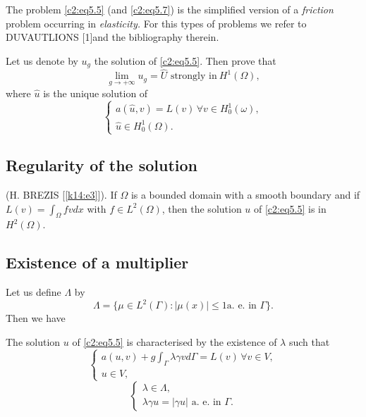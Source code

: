 \begin{remark}\label{c2:rem5.3}%
The problem \eqref{c2:eq5.5} (and \eqref{c2:eq5.7}) is the  simplified version of a {\em
  friction} problem occurring in {\em elasticity.} For  this types of
problems we refer to DUVAUTLIONS [1]and the bibliography therein. 
 \end{remark} 

 \begin{exercise}\label{c2:exer5.1}%
 Let us denote by $u_g$ the solution of \eqref{c2:eq5.5}. Then prove
 that  
 $$
 \lim_{g \to + \infty}  u_g = \hat{U}\text{ strongly in}~ H^1(\Omega),  
 $$
 where $\hat{u}$ is the unique solution of 
\begin{equation*}
\begin{cases}
a(\hat{u}, v) = L (v)\, \forall  v \in H^1_0 (\omega),\\ 
 \hat{u}\in H^1_0 (\Omega).
 \end{cases}
 \end{equation*}
  \end{exercise} 
  
 \subsection{Regularity of the solution}\label{c2:ss5.2}
 
 \begin{theorem}\label{c2:thm5.2}%
 (H. BREZIS [\ref{k14:e3}]). If $\Omega$ is a bounded domain  with a smooth
   boundary and if $L(v) = \int_\Omega f  v dx$ with $f \in
   L^2(\Omega)$, then the solution $u$ of \eqref{c2:eq5.5} is in $H^2(\Omega)$. 
 \end{theorem} 
 
 \subsection{Existence of a multiplier}\label{c2:ss5.3} 
Let us define $\Lambda$ by 
 $$
\Lambda  = \{\mu \in L^2 (\Gamma) : |\mu (x)| \leq 1  \text{
  a. e. in }\Gamma \}. 
 $$
Then we have 
\begin{theorem}\label{c2:thm5.3}%
 The solution $u$ of \eqref{c2:eq5.5} is characterised by the
 existence of $\lambda$ such that  
 \begin{equation}
\begin{cases}
a(u, v) + g \int_\Gamma \lambda \gamma v d \Gamma = L(v)\, \forall  v
\in V,\\ 
 u \in V, \tag{5.8}\label{c2:eq5.8}
\end{cases}
 \end{equation} 
 \begin{equation}
\begin{cases}
\lambda \in \Lambda , \\
 \lambda \gamma u = |\gamma u|  \text{ a. e. in
 }\Gamma.\tag{5.9}\label{c2:eq5.9}  
\end{cases}
 \end{equation}\pageoriginale 
 \end{theorem} 
 

